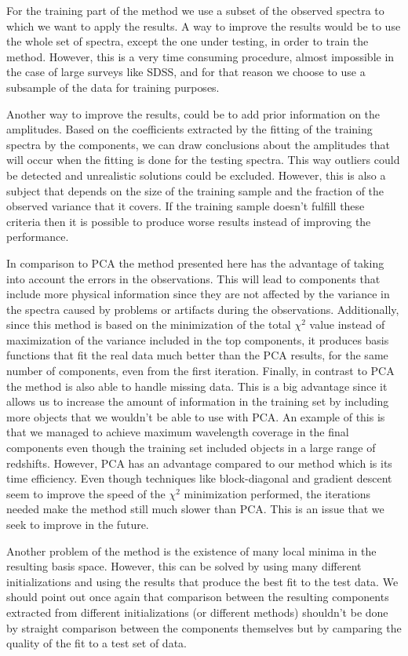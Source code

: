 \documentclass[12pt,preprint]{aastex}
\begin{document}
For the training part of the method we use a subset of the observed spectra to which we want to apply the results. A way to improve the results would be to use the whole set of spectra, except the one under testing, in order to train the method. However, this is a very time consuming procedure, almost impossible in the case of large surveys like SDSS, and for that reason we choose to use a subsample of the data for training purposes.

Another way to improve the results, could be to add prior information on the amplitudes. Based on the coefficients extracted by the fitting of the training spectra by the components, we can draw conclusions about the amplitudes that will occur when the fitting is done for the testing spectra. This way outliers could be detected and unrealistic solutions could be excluded. However, this is also a subject that depends on the size of the training sample and the fraction of the observed variance that it covers. If the training sample doesn't fulfill these criteria then it is possible to produce worse results instead of improving the performance.

In comparison to PCA the method presented here has the advantage of taking into account the errors in the observations. This will lead to components that include more physical information since they are not affected by the variance in the spectra caused by problems or artifacts during the observations. Additionally, since this method is based on the minimization of the total $\chi^2$ value instead of maximization of the variance included in the top components, it produces basis functions that fit the real data much better than the PCA results, for the same number of components, even from the first iteration. Finally, in contrast to PCA the method is also able to handle missing data. This is a big advantage since it allows us to increase the amount of information in the training set by including more objects that we wouldn't be able to use with PCA. An example of this is that we managed to achieve maximum wavelength coverage in the final components even though the training set included objects in a large range of redshifts. However, PCA has an advantage compared to our method which is its time efficiency. Even though techniques like block-diagonal and gradient descent seem to improve the speed of the $\chi^2$ minimization performed, the iterations needed make the method still much slower than PCA. This is an issue that we seek to improve in the future.

Another problem of the method is the existence of many local minima in the resulting basis space. However, this can be solved by using many different initializations and using the results that produce the best fit to the test data. We should point out once again that comparison between the resulting components extracted from different initializations (or different methods) shouldn't be done by straight comparison between the components themselves but by camparing the quality of the fit to a test set of data.
\end{document}
